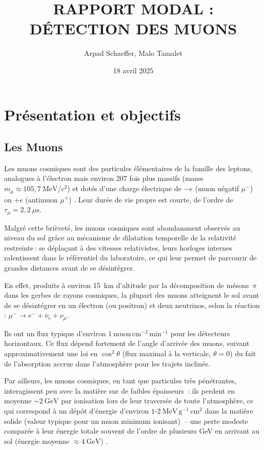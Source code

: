 \documentclass[a4paper,12pt,twoside]{article}
\title{RAPPORT MODAL :\\ DÉTECTION DES MUONS}
\author{Arpad Schaeffer, Malo Tamalet}
\date{18 avril 2025}
\begin{document}
\maketitle

\tableofcontents
\listoffigures
\newpage

\section{Présentation et objectifs}
\subsection{Les Muons}
Les muons cosmiques sont des particules élémentaires de la famille des leptons, analogues à l’électron mais environ 207 fois plus massifs (masse $m_\mu \approx 105{,}7\ \mathrm{MeV}/c^2$) et dotés d’une charge électrique de $-e$ (muon négatif $\mu^-$) ou $+e$ (antimuon $\mu^+$) \cite{wikimuon,knoll2010}. Leur durée de vie propre est courte, de l’ordre de $\tau_\mu = 2{,}2\ \mu\mathrm{s}$. 

Malgré cette brièveté, les muons cosmiques sont abondamment observés au niveau du sol grâce au mécanisme de dilatation temporelle de la relativité restreinte\,:
se déplaçant à des vitesses relativistes, leurs horloges internes \og ralentissent\fg{} dans le référentiel du laboratoire, ce qui leur permet de parcourir de grandes distances avant de se désintégrer.

En effet, produits à environ 15~km d’altitude par la décomposition de mésons~$\pi$ dans les gerbes de rayons cosmiques, la plupart des muons atteignent le sol avant de se désintégrer en un électron (ou positron) et deux neutrinos, selon la réaction : $\mu^- \to e^- + \bar{\nu}_e + \nu_\mu$.

Ils ont un flux typique d’environ $1\ \text{muon}\,\mathrm{cm^{-2}}\,\mathrm{min^{-1}}$
pour les détecteurs horizontaux. Ce flux dépend fortement de l’angle d’arrivée des muons, suivant approximativement une loi en $\cos^2\theta$ (flux maximal à la verticale, $\theta=0$) du fait de l’absorption accrue dans l’atmosphère pour les trajets inclinés.

Par ailleurs, les muons cosmiques, en tant que particules très pénétrantes, interagissent peu avec la matière sur de faibles épaisseurs : ils perdent en moyenne $\sim2\ \mathrm{GeV}$ par ionisation lors de leur traversée de toute l’atmosphère, ce qui correspond à un dépôt d’énergie d’environ $1\text{-}2\ \mathrm{MeV}\,\mathrm{g^{-1}}\,\mathrm{cm^2}$
dans la matière solide (valeur typique pour un muon minimum ionisant) – une perte modeste comparée à leur énergie totale souvent de l’ordre de plusieurs GeV en arrivant au sol (énergie moyenne $\approx4\ \mathrm{GeV}$) \cite{bethe1930}.
\newpage
\end{document}
